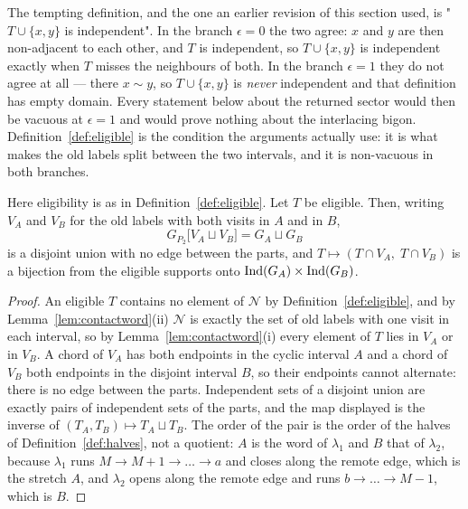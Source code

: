 \begin{remark}
\label{rem:eligibility}
The tempting definition, and the one an earlier revision of this section used,
is "$T\cup\{x,y\}$ is independent". In the branch $\epsilon=0$ the two agree:
$x$ and $y$ are then non-adjacent to each other, and $T$ is independent, so
$T\cup\{x,y\}$ is independent exactly when $T$ misses the neighbours of both.
In the branch $\epsilon=1$ they do not agree at all --- there $x\sim y$, so
$T\cup\{x,y\}$ is \emph{never} independent and that definition has empty
domain. Every statement below about the returned sector would then be
vacuous at $\epsilon=1$ and would prove nothing about the interlacing bigon.
Definition~\ref{def:eligible} is the condition the arguments actually use: it
is what makes the old labels split between the two intervals, and it is
non-vacuous in both branches.
\end{remark}

\begin{lemma}\label{lem:orderedproduct}
Here eligibility is as in Definition~\ref{def:eligible}.
Let $T$ be eligible. Then, writing $V_A$ and $V_B$ for the old labels with both
visits in $A$ and in $B$,
\[
   G_{P_2}\bigl[V_A\sqcup V_B\bigr]=G_A\sqcup G_B
\]
is a disjoint union with no edge between the parts, and
$T\mapsto(T\cap V_A,\;T\cap V_B)$ is a bijection from the eligible supports
onto $\operatorname{Ind}(G_A)\times\operatorname{Ind}(G_B)$.
\end{lemma}
\begin{proof}
An eligible $T$ contains no element of $\mathcal N$ by
Definition~\ref{def:eligible}, and by Lemma~\ref{lem:contactword}(ii)
$\mathcal N$ is exactly the set of old labels with one visit in each interval,
so by Lemma~\ref{lem:contactword}(i) every element of $T$ lies in $V_A$ or in
$V_B$. A chord of $V_A$ has both endpoints in the cyclic interval $A$ and a
chord of $V_B$ both endpoints in the disjoint interval $B$, so their endpoints
cannot alternate: there is no edge between the parts. Independent sets of a
disjoint union are exactly pairs of independent sets of the parts, and the map
displayed is the inverse of $(T_A,T_B)\mapsto T_A\sqcup T_B$. The order of the
pair is the order of the halves of Definition~\ref{def:halves}, not a quotient:
$A$ is the word of $\lambda_1$ and $B$ that of $\lambda_2$, because $\lambda_1$
runs $M\to M+1\to\dots\to a$ and closes along the remote edge, which is the
stretch $A$, and $\lambda_2$ opens along the remote edge and runs
$b\to\dots\to M-1$, which is $B$.
\end{proof}

